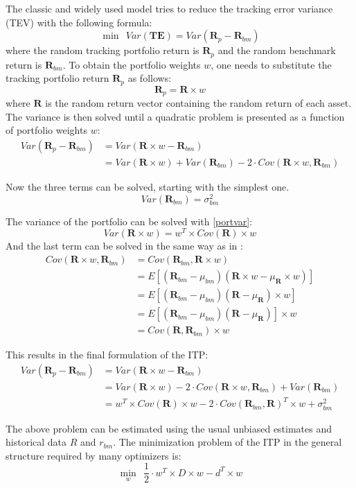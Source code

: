 \documentclass[
  oneside]{book}
\begin{document}
The classic and widely used model tries to reduce the tracking error variance (TEV) with the following formula:
\[
 \min \ \ Var(\pmb{TE}) = Var(\pmb{R}_{p}-\pmb{R}_{bm})
\]
where the random tracking portfolio return is \(\pmb{R}_{p}\) and the random benchmark return is \(\pmb{R}_{bm}\). To obtain the portfolio weights \(w\), one needs to substitute the tracking portfolio return \(\pmb{R}_{p}\) as follows:
\[
  \pmb{R}_{p} = \pmb{R} \times w
\]
where \(\pmb{R}\) is the random return vector containing the random return of each asset. The variance is then solved until a quadratic problem is presented as a function of portfolio weights \(w\):
\begin{align*}
 Var(\pmb{R}_{p}-\pmb{R}_{bm}) &= Var(\pmb{R} \times w - \pmb{R}_{bm}) \\
 &= Var(\pmb{R} \times w) + Var(\pmb{R}_{bm}) - 2 \cdot Cov(\pmb{R} \times w,\pmb{R}_{bm}) 
\end{align*}

Now the three terms can be solved, starting with the simplest one.
\[
Var(\pmb{R}_{bm}) = \sigma_{bm}^2
\]

The variance of the portfolio can be solved with \ref{portvar}:
\[
Var(\pmb{R} \times w) = w^T \times Cov(\pmb{R}) \times w
\]
And the last term can be solved in the same way as in \citep{Eric2021}:
\begin{align*}
  Cov(\pmb{R} \times w, \pmb{R}_{bm}) &= Cov(\pmb{R}_{bm}, \pmb{R} \times w) \\
  &= E[(\pmb{R}_{bm}-\mu_{bm})(\pmb{R} \times w-\mu_{\pmb{R}} \times w)] \\
  &= E[(\pmb{R}_{bm}-\mu_{bm})(\pmb{R}-\mu_{\pmb{R}}) \times w] \\
  &= E[(\pmb{R}_{bm}-\mu_{bm})(\pmb{R}-\mu_{\pmb{R}})] \times w \\
  &= Cov(\pmb{R},\pmb{R}_{bm}) \times w
\end{align*}

This results in the final formulation of the ITP:
\begin{align*}
  Var(\pmb{R}_{p}-\pmb{R}_{bm}) & = Var(\pmb{R} \times w - \pmb{R}_{bm}) \\
  & = Var(\pmb{R} \times w) - 2 \cdot Cov(\pmb{R} \times w,\pmb{R}_{bm}) + Var(\pmb{R}_{bm})  \\
  & = w^T \times Cov(\pmb{R}) \times w - 2 \cdot Cov(\pmb{R}_{bm}, \pmb{R})^T \times w + \sigma_{bm}^2
  \label{eq:ITP}
\end{align*}

The above problem can be estimated using the usual unbiased estimates and historical data \(R\) and \(r_{bm}\). The minimization problem of the ITP in the general structure required by many optimizers is:
\[
  \min\limits_{w} \ \ \frac{1}{2} \cdot w^T \times D \times w -d^T \times w
\]
\end{document}
